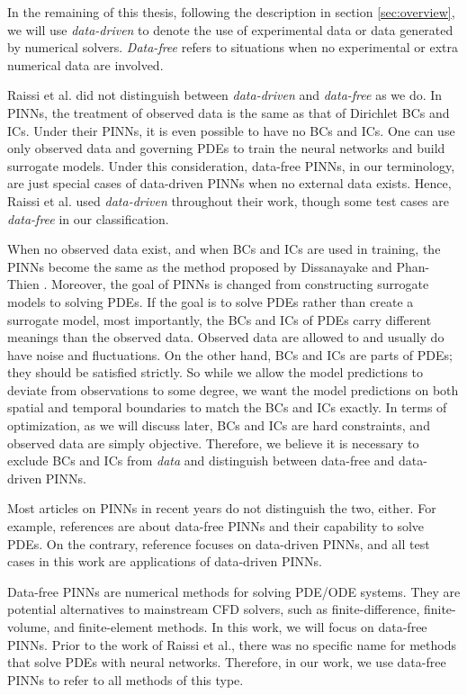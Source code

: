 In the remaining of this thesis, following the description in section \ref{sec:overview}, we will use {\it data-driven} to denote the use of experimental data or data generated by numerical solvers.
{\it Data-free} refers to situations when no experimental or extra numerical data are involved. 

Raissi et al. did not distinguish between {\it data-driven} and {\it data-free} as we do.
In PINNs, the treatment of observed data is the same as that of Dirichlet BCs and ICs.
Under their PINNs, it is even possible to have no BCs and ICs.
One can use only observed data and governing PDEs to train the neural networks and build surrogate models.
Under this consideration, data-free PINNs, in our terminology, are just special cases of data-driven PINNs when no external data exists.
Hence, Raissi et al. used {\it data-driven} throughout their work, though some test cases are {\it data-free} in our classification.

When no observed data exist, and when BCs and ICs are used in training, the PINNs become the same as the method proposed by Dissanayake and Phan-Thien \cite{dissanayake_neural-network-based_1994}.
Moreover, the goal of PINNs is changed from constructing surrogate models to solving PDEs.
If the goal is to solve PDEs rather than create a surrogate model, most importantly, the BCs and ICs of PDEs carry different meanings than the observed data.
Observed data are allowed to and usually do have noise and fluctuations.
On the other hand, BCs and ICs are parts of PDEs; they should be satisfied strictly.
So while we allow the model predictions to deviate from observations to some degree, we want the model predictions on both spatial and temporal boundaries to match the BCs and ICs exactly.
In terms of optimization, as we will discuss later, BCs and ICs are hard constraints, and observed data are simply objective.
Therefore, we believe it is necessary to exclude BCs and ICs from {\it data} and distinguish between data-free and data-driven PINNs.

Most articles on PINNs in recent years do not distinguish the two, either.
For example, references \cite{wang_understanding_2021,krishnapriyan_characterizing_2021,wang_when_2022} are about data-free PINNs and their capability to solve PDEs.
On the contrary, reference \cite{cai_physics-informed_2021} focuses on data-driven PINNs, and all test cases in this work are applications of data-driven PINNs.

Data-free PINNs are numerical methods for solving PDE/ODE systems.
They are potential alternatives to mainstream CFD solvers, such as finite-difference, finite-volume, and finite-element methods.
In this work, we will focus on data-free PINNs.
Prior to the work of Raissi et al., there was no specific name for methods that solve PDEs with neural networks.
Therefore, in our work, we use data-free PINNs to refer to all methods of this type.

